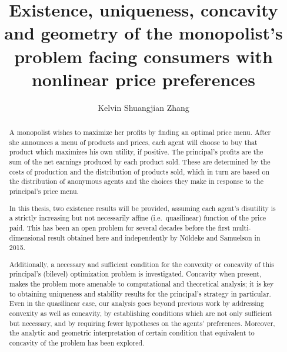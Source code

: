 \documentclass{ut-thesis}[10pt]
\author{Kelvin Shuangjian Zhang}
\title{Existence, uniqueness, concavity and geometry of the monopolist's problem facing consumers with nonlinear price preferences}
\theoremstyle{plain}
\theoremstyle{definition}
\theoremstyle{remark}
\numberwithin{equation}{section}
\begin{document}
\begin{preliminary}

\maketitle

\cleardoublepage

\begin{abstract}

	A monopolist wishes to maximize her profits by finding an optimal price menu. After she announces a menu of products and prices, each agent will choose to buy that product which maximizes his own utility, if positive. 
	The principal's profits are the sum of the net earnings produced by each product sold.  
	These are determined by the costs of production and the distribution of products sold, which in turn are based on the distribution of anonymous agents and
	the choices they make in response to the principal's price menu.  
	
	In this thesis, two existence results will be provided, assuming each agent's disutility is a strictly increasing but not necessarily affine (i.e.\ quasilinear) function of the price paid. This has been an open problem for several decades before the first multi-dimensional result obtained here and independently by N\"oldeke and Samuelson in 2015.
	
	Additionally, a necessary and sufficient condition for the convexity or concavity of this principal's (bilevel) optimization problem is investigated. 
	Concavity when present, makes the problem more amenable to 
	computational and theoretical analysis;  it is key to obtaining uniqueness and stability results for the principal's strategy in particular.  Even in the quasilinear case, our analysis goes beyond previous work by addressing convexity as well as concavity,  by establishing conditions which are not only sufficient but necessary,  and by requiring fewer hypotheses on the agents' preferences.	Moreover, the analytic and geometric interpretation of certain condition that equivalent to concavity of the problem has been explored.
	

\end{abstract}
\end{preliminary}
\end{document}
